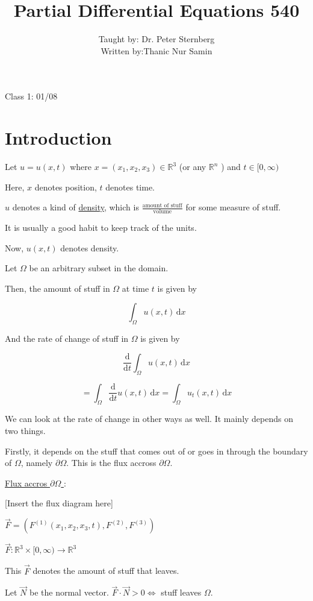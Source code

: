 \documentclass{article}
\title{Partial Differential Equations 540}
\author{Taught by: Dr. Peter Sternberg \\ Written by:Thanic Nur Samin}
\date{\vspace{-5ex}}
\theoremstyle{definition}
\begin{document}
\maketitle

Class 1: 01/08

\section*{Introduction}

Let \(u=u(x,t)\) where \(x=(x_1, x_2, x_3) \in \mathbb{R}^3\) (or any \(\mathbb{R} ^n\) ) and \(t\in [0,\infty)\) 

Here, \(x\) denotes position, \(t\) denotes time.

\(u\) denotes a kind of \underline{density}, which is \(\frac{\text{amount of stuff}}{\text{volume}}\) for some measure of stuff.

It is usually a good habit to keep track of the units.

Now, \(u(x,t)\) denotes density.

Let \(\Omega\) be an arbitrary subset in the domain.

Then, the amount of stuff in \(\Omega \) at time \(t\) is given by

\[
    \int _\Omega u(x,t) \, \mathrm{d} x
\]

And the rate of change of stuff in \(\Omega \) is given by

\[
    \frac{\mathrm{d}}{\mathrm{d}t} \int _\Omega u(x,t) \, \mathrm{d} x
\]

\[
    =\int_{\Omega }^{} \frac{\mathrm{d}}{\mathrm{d}t} u(x,t) \,\mathrm{d}x = \int_{\Omega }^{} u_t(x,t) \,\mathrm{d}x 
\]

We can look at the rate of change in other ways as well. It mainly depends on two things.

Firstly, it depends on the stuff that comes out of or goes in through the boundary of \(\Omega \), namely \(\partial \Omega \). This is the flux accross \(\partial \Omega \).

\underline{Flux accros \(\partial \Omega \) }:

[Insert the flux diagram here]

\(\vec{F} =(F^{(1)}(x_1, x_2, x_3, t),F^{(2)}, F^{(3)})\) 

\(\vec{F} :\mathbb{R} ^3 \times [0,\infty) \to \mathbb{R}^3\) 

This \(\vec{F} \) denotes the amount of stuff that leaves.

Let \(\vec{N} \) be the normal vector. \(\vec{F} \cdot \vec{N} >0 \iff \) stuff leaves \(\Omega \).
\end{document}

